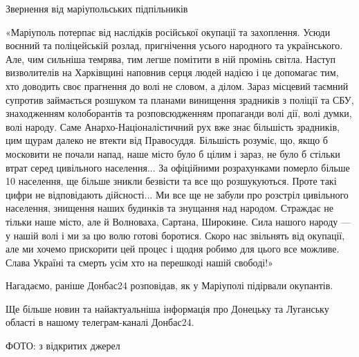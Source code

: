 Звернення від маріупольських підпільників 

«Маріуполь потерпає від наслідків російської окупації та захоплення. Усюди
воєнний та поліцейській розлад, пригнічення усього народного та українського.
Але, чим сильніша темрява, тим легше помітити в ній промінь світла. Наступ
визволителів на Харківщині наповнив серця людей надією і це допомагає тим, хто
доводить своє прагнення до волі не словом, а ділом. Зараз місцевий таємний
супротив займається розшуком та планами винищення зрадників з поліції та СБУ,
знаходженням колоборантів та розповсюдженням пропаганди волі дії, волі думки,
волі народу. Саме Анархо-Націоналістичний рух вже знає більшість зрадників, цим
щурам далеко не втекти від Правосуддя. Більшість розуміє, що, якщо б московити
не почали напад, наше місто було б цілим і зараз, не було б стільки втрат серед
цивільного населення... За офіційними розрахунками померло більше 10%
населення, ще більше зникли безвісти та все що розшукуються. Проте такі цифри
не відповідають дійсності... Ми все ще не забули про розстріл цивільного
населення, знищення наших будинків та знущання над народом. Страждає не тільки
наше місто, але й Волноваха, Сартана, Широкине. Сила нашого народу — у нашій
волі і ми за цю волю готові боротися. Скоро нас звільнять від окупації, але ми
хочемо прискорити цей процес і щодня робимо для цього все можливе. Слава
Україні та смерть усім хто на перешкоді нашій свободі!»

Нагадаємо, раніше Донбас24 розповідав, як у Маріуполі підірвали окупантів.

Ще більше новин та найактуальніша інформація про Донецьку та Луганську області
в нашому телеграм-каналі Донбас24.

ФОТО: з відкритих джерел
